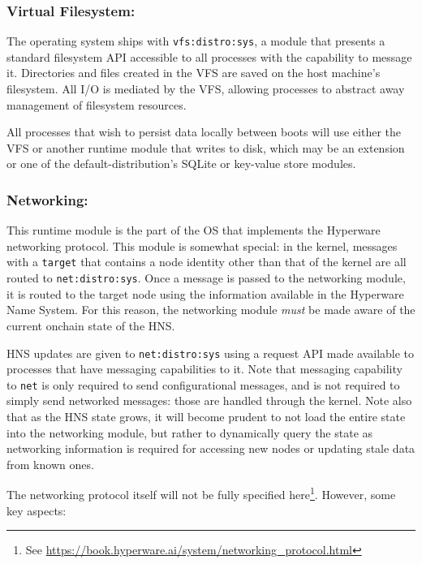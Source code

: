 \documentclass[runningheads]{llncs}
\begin{document}
\subsubsection{Virtual Filesystem:}
\label{sec:osvfs}

The operating system ships with \verb|vfs:distro:sys|, a module that presents a standard filesystem API accessible to all processes with the capability to message it.
Directories and files created in the VFS are saved on the host machine's filesystem.
All I/O is mediated by the VFS, allowing processes to abstract away management of filesystem resources.

All processes that wish to persist data locally between boots will use either the VFS or another runtime module that writes to disk, which may be an extension or one of the default-distribution's SQLite or key-value store modules.

\subsubsection{Networking:}
\label{sec:osnetworking}

This runtime module is the part of the OS that implements the Hyperware networking protocol.
This module is somewhat special: in the kernel, messages with a \verb|target| that contains a node identity other than that of the kernel are all routed to \verb|net:distro:sys|.
Once a message is passed to the networking module, it is routed to the target node using the information available in the Hyperware Name System.
For this reason, the networking module \textit{must} be made aware of the current onchain state of the HNS.

HNS updates are given to \verb|net:distro:sys| using a request API made available to processes that have messaging capabilities to it.
Note that messaging capability to \verb|net| is only required to send configurational messages, and is not required to simply send networked messages: those are handled through the kernel.
Note also that as the HNS state grows, it will become prudent to not load the entire state into the networking module, but rather to dynamically query the state as networking information is required for accessing new nodes or updating stale data from known ones.

The networking protocol itself will not be fully specified here\footnote{See \url{https://book.hyperware.ai/system/networking_protocol.html}}.
However, some key aspects:
\end{document}
